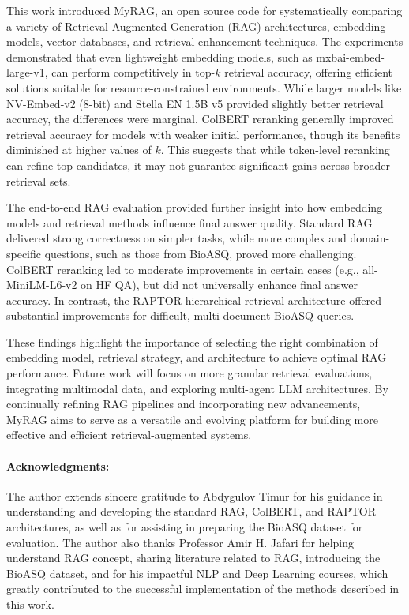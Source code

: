 \documentclass[pdflatex,sn-mathphys-num]{sn-jnl}%
\theoremstyle{thmstyleone}%
\theoremstyle{thmstyletwo}%
\theoremstyle{thmstylethree}%
\begin{document}
This work introduced MyRAG, an open source code for systematically comparing a variety of Retrieval-Augmented Generation (RAG) architectures, embedding models, vector databases, and retrieval enhancement techniques. The experiments demonstrated that even lightweight embedding models, such as mxbai-embed-large-v1, can perform competitively in top-$k$ retrieval accuracy, offering efficient solutions suitable for resource-constrained environments. While larger models like NV-Embed-v2 (8-bit) and Stella EN 1.5B v5 provided slightly better retrieval accuracy, the differences were marginal. ColBERT reranking generally improved retrieval accuracy for models with weaker initial performance, though its benefits diminished at higher values of $k$. This suggests that while token-level reranking can refine top candidates, it may not guarantee significant gains across broader retrieval sets.

The end-to-end RAG evaluation provided further insight into how embedding models and retrieval methods influence final answer quality. Standard RAG delivered strong correctness on simpler tasks, while more complex and domain-specific questions, such as those from BioASQ, proved more challenging. ColBERT reranking led to moderate improvements in certain cases (e.g., all-MiniLM-L6-v2 on HF QA), but did not universally enhance final answer accuracy. In contrast, the RAPTOR hierarchical retrieval architecture offered substantial improvements for difficult, multi-document BioASQ queries.

These findings highlight the importance of selecting the right combination of embedding model, retrieval strategy, and architecture to achieve optimal RAG performance. Future work will focus on more granular retrieval evaluations, integrating multimodal data, and exploring multi-agent LLM architectures. By continually refining RAG pipelines and incorporating new advancements, MyRAG aims to serve as a versatile and evolving platform for building more effective and efficient retrieval-augmented systems.

\paragraph{Acknowledgments:} The author extends sincere gratitude to Abdygulov Timur for his guidance in understanding and developing the standard RAG, ColBERT, and RAPTOR architectures, as well as for assisting in preparing the BioASQ dataset for evaluation. The author also thanks Professor Amir H. Jafari for helping understand RAG concept, sharing literature related to RAG, introducing the BioASQ dataset,  and for his impactful NLP and Deep Learning courses, which greatly contributed to the successful implementation of the methods described in this work.

\end{document}
